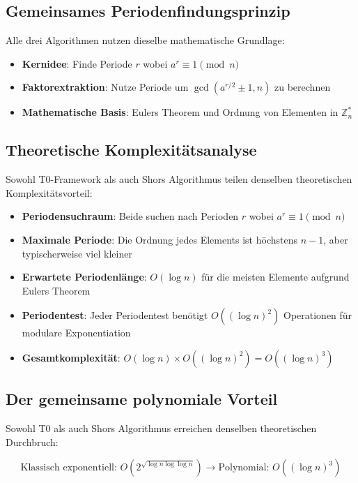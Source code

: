 	\subsection{Gemeinsames Periodenfindungsprinzip}
	
	Alle drei Algorithmen nutzen dieselbe mathematische Grundlage:
	
	\begin{itemize}
		\item \textbf{Kernidee}: Finde Periode $r$ wobei $a^r \equiv 1 \pmod{n}$
		\item \textbf{Faktorextraktion}: Nutze Periode um $\gcd(a^{r/2} \pm 1, n)$ zu berechnen
		\item \textbf{Mathematische Basis}: Eulers Theorem und Ordnung von Elementen in $\mathbb{Z}_n^*$
	\end{itemize}
	
	\subsection{Theoretische Komplexitätsanalyse}
	
	Sowohl T0-Framework als auch Shors Algorithmus teilen denselben theoretischen Komplexitätsvorteil:
	
	\begin{itemize}
		\item \textbf{Periodensuchraum}: Beide suchen nach Perioden $r$ wobei $a^r \equiv 1 \pmod{n}$
		\item \textbf{Maximale Periode}: Die Ordnung jedes Elements ist höchstens $n-1$, aber typischerweise viel kleiner
		\item \textbf{Erwartete Periodenlänge}: $O(\log n)$ für die meisten Elemente aufgrund Eulers Theorem
		\item \textbf{Periodentest}: Jeder Periodentest benötigt $O((\log n)^2)$ Operationen für modulare Exponentiation
		\item \textbf{Gesamtkomplexität}: $O(\log n) \times O((\log n)^2) = O((\log n)^3)$
	\end{itemize}
	
	\subsection{Der gemeinsame polynomiale Vorteil}
	
	Sowohl T0 als auch Shors Algorithmus erreichen denselben theoretischen Durchbruch:
	
	\begin{equation}
		\text{Klassisch exponentiell: } O(2^{\sqrt{\log n \log \log n}}) \rightarrow \text{Polynomial: } O((\log n)^3)
	\end{equation}
	
